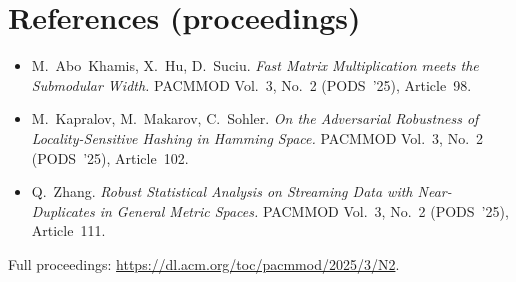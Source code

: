 \documentclass[11pt,a4paper]{article}
\begin{document}
\section*{References (proceedings)}

\begin{itemize}[leftmargin=*,itemsep=2pt]
  \item M.~Abo~Khamis, X.~Hu, D.~Suciu. \emph{Fast Matrix Multiplication
        meets the Submodular Width.} PACMMOD Vol.~3, No.~2 (PODS~'25),
        Article~98.
  \item M.~Kapralov, M.~Makarov, C.~Sohler. \emph{On the Adversarial
        Robustness of Locality-Sensitive Hashing in Hamming Space.}
        PACMMOD Vol.~3, No.~2 (PODS~'25), Article~102.
  \item Q.~Zhang. \emph{Robust Statistical Analysis on Streaming Data
        with Near-Duplicates in General Metric Spaces.} PACMMOD Vol.~3,
        No.~2 (PODS~'25), Article~111.
\end{itemize}

Full proceedings: \url{https://dl.acm.org/toc/pacmmod/2025/3/N2}.
\end{document}

